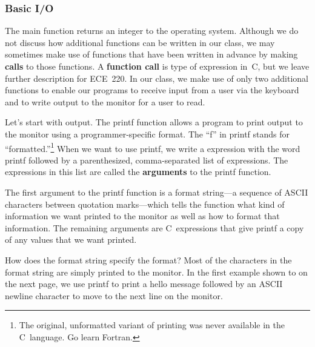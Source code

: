 \subsubsection{Basic I/O}

The {\tfix main} function returns an integer to the operating system.
Although we do not discuss how additional functions can be written
in our class, we may sometimes make use of functions that have been
written in advance by making {\bf calls} to those functions.
A {\bf function call} is type of expression in~C, but we leave 
further description for ECE~220.  In our class, we make use of only
two additional functions to enable our programs to receive input
from a user via the keyboard and to write output to the monitor for 
a user to read.

Let's start with output.  The {\tfix printf} function allows a program
to print output to the monitor using a programmer-specific format.
The ``f'' in {\tfix printf} stands for ``formatted.''\footnote{The 
original, unformatted variant of printing was never available
in the C~language.  Go learn Fortran.}
%
When we want to use {\tfix printf}, we write a expression with
the word {\tfix printf} followed by a parenthesized, comma-separated
list of expressions.  The expressions in this list are called
the {\bf arguments} to the {\tfix printf} function.

The first argument to the {\tfix printf} function is a format string---a 
sequence of ASCII characters between quotation marks---which tells 
the function what kind of information we want printed to
the monitor as well as how to format that information.
%
The remaining arguments are C~expressions that give {\tfix printf}
a copy of any values that we want printed.

How does the format string specify the format?
%
Most of the characters in the format string are simply printed to 
the monitor.  
%
In the first example shown to on the next page, we use {\tfix printf}
to print a hello message followed by an ASCII newline character
to move to the next line on the monitor.

